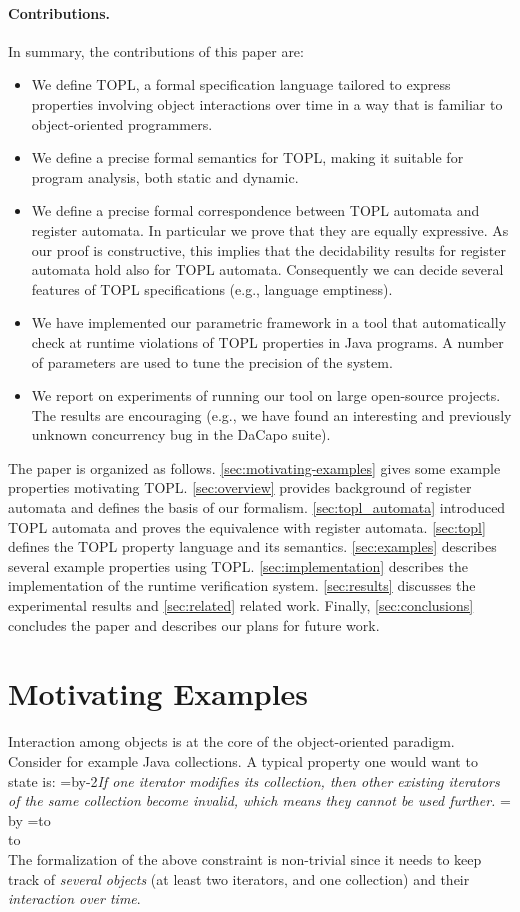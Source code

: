 \documentclass[9pt, preprint]{sigplanconf} %
\newcommand{\quoteindent}{1.5\parindent} %
\newcommand{\eqquote}[2]{{%
  \refstepcounter{equation}\label{#2}%
  \newdimen\qi\qi=\quoteindent
  \setbox0=\vbox{\advance\hsize by-2\qi\noindent\em#1}%
  \newdimen\x\x=\ht0 \advance\x by\dp0%
  \setbox1=\vbox to\x{\vss\hbox{(\arabic{equation})}\vss}%
  \leavevmode\\[1ex]%
  \hbox to\hsize{\hskip\qi\box0\hfil\box1}%
  \\[1ex]}}
\theoremstyle{definition}
\theoremstyle{remark}
\begin{document}
\paragraph{Contributions.}
In summary, the contributions of this paper are:
\begin{itemize}
\item We define TOPL, a formal specification language tailored to express properties involving object interactions over time in a way that is familiar to object-oriented programmers.
\item We define a precise formal semantics for TOPL, making it suitable for program analysis, both static and dynamic.
\item We define a precise formal correspondence between TOPL automata and register automata. 
In particular we prove that they are equally expressive. As our proof is constructive, this implies that the decidability results for register automata hold also for TOPL automata. Consequently we can decide several features of TOPL specifications (e.g., language emptiness).
\item We have implemented our parametric framework  in a tool that automatically check at runtime violations of TOPL properties in Java programs. A number of parameters are used to tune the precision of the system.

\item We report on experiments of running our tool on large open-source projects. The results are encouraging (e.g., we have found
an interesting and previously unknown  concurrency bug in the DaCapo suite). 
\end{itemize}


The paper is organized as follows.
\autoref{sec:motivating-examples} gives some example properties motivating TOPL.
\autoref{sec:overview} provides background of register automata and defines the basis of our formalism.
\autoref{sec:topl_automata} introduced TOPL automata and proves the equivalence with register automata. 
\autoref{sec:topl} defines the TOPL property language and its semantics.
\autoref{sec:examples} describes several example properties using TOPL.
\autoref{sec:implementation} describes  the implementation of the runtime  verification system.
\autoref{sec:results} discusses the experimental results and \autoref{sec:related}  related work.
Finally, \autoref{sec:conclusions} concludes the paper and describes our plans for future work.

\section{Motivating Examples} %
\label{sec:motivating-examples}
Interaction among objects is at the core of the object-oriented paradigm.
Consider for example  Java collections. A typical property one would want to state  is:
\eqquote{If one iterator modifies its collection, then other existing iterators of the same collection become invalid, which means they cannot be used further.}{q:concur-it}
The formalization of the above constraint is non-trivial since it needs to keep track of {\em several objects} (at least two iterators, and one collection) and their {\em interaction over time}.
\end{document}
